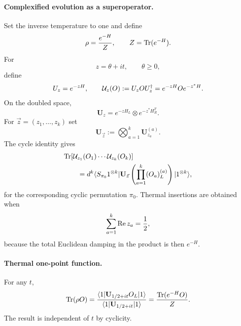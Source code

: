 \documentclass{article}
\theoremstyle{definition}
\begin{document}
\paragraph{Complexified evolution as a superoperator.}
Set the inverse temperature to one and define
\begin{equation}
    \rho=\frac{e^{-H}}{Z},
    \qquad Z={\rm Tr}(e^{-H}).
\end{equation}
For
\begin{equation}
    z=\theta+it,
    \qquad \theta\ge0,
\end{equation}
define
\begin{equation}
    U_z=e^{-zH},
    \qquad
    {\cal U}_z(O):=U_zOU_z^\dagger
    =e^{-zH}Oe^{-z^*H}.
\end{equation}
On the doubled space,
\begin{equation}
    \mathbf U_z
    =e^{-zH_L}\otimes e^{-z^*H_R^T}.
\end{equation}
For $\vec z=(z_1,\ldots,z_k)$ set
\begin{equation}
    \mathbf U_{\vec z}
    :=\bigotimes_{a=1}^k\mathbf U_{z_a}^{(a)}.
\end{equation}
The cycle identity gives
\begin{align}
    &{\rm Tr}\!\left[
       {\cal U}_{z_1}(O_1)\cdots{\cal U}_{z_k}(O_k)
    \right]
    \nonumber\\
    &\qquad=
    d^k
    \langle S_{\pi_0}1^{\otimes k}|
    \mathbf U_{\vec z}
    \left(\prod_{a=1}^k(O_a)_L^{(a)}\right)
    |1^{\otimes k}\rangle,
\end{align}
for the corresponding cyclic permutation $\pi_0$.  Thermal insertions are
obtained when
\begin{equation}
    \sum_{a=1}^k{\rm Re}\,z_a=\frac12,
\end{equation}
because the total Euclidean damping in the product is then $e^{-H}$.

\paragraph{Thermal one-point function.}
For any $t$,
\begin{equation}
    {\rm Tr}(\rho O)
    =\frac{
      \langle1|\mathbf U_{1/2+it}O_L|1\rangle
    }{
      \langle1|\mathbf U_{1/2+it}|1\rangle
    }
    =\frac{{\rm Tr}(e^{-H}O)}{Z}.
\end{equation}
The result is independent of $t$ by cyclicity.
\end{document}

